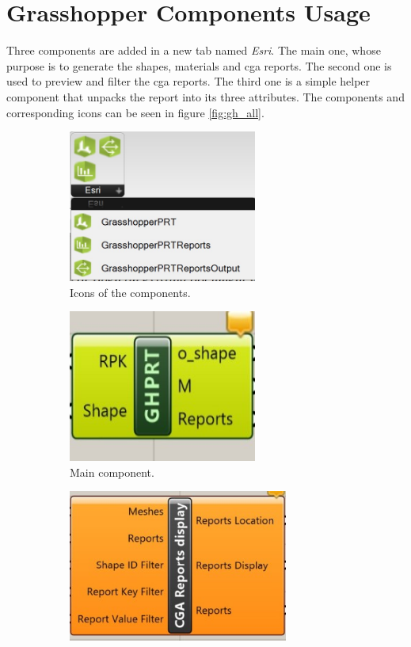 \section{Grasshopper Components Usage}

Three components are added in a new tab named \textit{Esri}. The main one, whose purpose is to generate the shapes, materials and cga reports. The second one is used to preview and filter the cga reports. The third one is a simple helper component that unpacks the report into its three attributes. The components and corresponding icons can be seen in figure \ref{fig:gh_all}.

\begin{figure}[h]

    \begin{subfigure}{0.5\textwidth}
        \includegraphics[width=0.9\linewidth, height = 5cm]{res/man_gh_icons.jpg}
        \caption{Icons of the components.}
        \label{fig:gh_subim_icons}
    \end{subfigure}
    \begin{subfigure}{0.5\textwidth}
        \includegraphics[width=0.9\linewidth, height = 5cm]{res/man_gh_main_comp.jpg}
        \caption{Main component.}
        \label{fig:gh_subim_main}
    \end{subfigure}
    \begin{subfigure}{0.5\textwidth}
        \includegraphics[width=0.9\linewidth, height = 5cm]{res/man_gh_filter_comp.jpg}

\end{subfigure}
\end{figure}
